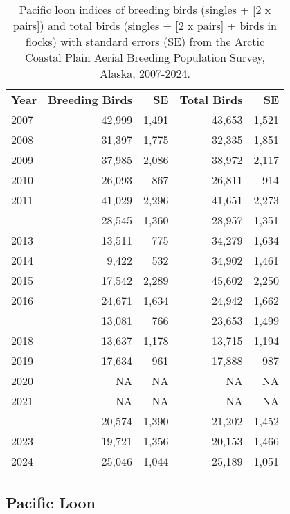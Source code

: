 \documentclass[
]{article}
\begin{document}
\begin{longtable}[t]{lrrrr}

\caption{\label{tbl-PALO}Pacific loon indices of breeding birds (singles
+ {[}2 x pairs{]}) and total birds (singles + {[}2 x pairs{]} + birds in
flocks) with standard errors (SE) from the Arctic Coastal Plain Aerial
Breeding Population Survey, Alaska, 2007-2024.}

\tabularnewline

\\
\toprule
\textbf{Year} & \textbf{Breeding Birds} & \textbf{SE} & \textbf{Total Birds} & \textbf{SE}\\
\midrule
2007 & 42,999 & 1,491 & 43,653 & 1,521\\
2008 & 31,397 & 1,775 & 32,335 & 1,851\\
2009 & 37,985 & 2,086 & 38,972 & 2,117\\
2010 & 26,093 & 867 & 26,811 & 914\\
2011 & 41,029 & 2,296 & 41,651 & 2,273\\
\addlinespace
2012 & 28,545 & 1,360 & 28,957 & 1,351\\
2013 & 13,511 & 775 & 34,279 & 1,634\\
2014 & 9,422 & 532 & 34,902 & 1,461\\
2015 & 17,542 & 2,289 & 45,602 & 2,250\\
2016 & 24,671 & 1,634 & 24,942 & 1,662\\
\addlinespace
2017 & 13,081 & 766 & 23,653 & 1,499\\
2018 & 13,637 & 1,178 & 13,715 & 1,194\\
2019 & 17,634 & 961 & 17,888 & 987\\
2020 & NA & NA & NA & NA\\
2021 & NA & NA & NA & NA\\
\addlinespace
2022 & 20,574 & 1,390 & 21,202 & 1,452\\
2023 & 19,721 & 1,356 & 20,153 & 1,466\\
2024 & 25,046 & 1,044 & 25,189 & 1,051\\
\bottomrule

\end{longtable}

\endgroup{}

\newpage{}

\subsection*{Pacific Loon}\label{pacific-loon-2}
\end{document}
